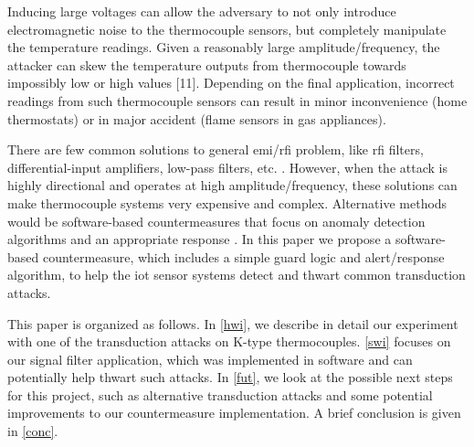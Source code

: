 Inducing large voltages can allow the adversary to not only introduce electromagnetic noise to the thermocouple sensors, but completely manipulate the temperature readings. Given a reasonably large amplitude/frequency, the attacker can skew the temperature outputs from thermocouple towards impossibly low or high values [11]. Depending on the final application, incorrect readings from such thermocouple sensors can result in minor inconvenience (home thermostats) or in major accident (flame sensors in gas appliances). 

There are few common solutions to general \ac{emi}/\ac{rfi} problem, like \ac{rfi} filters, differential-input amplifiers, low-pass filters, etc. \cite{Duff10}. However, when the attack is highly directional and operates at high amplitude/frequency, these solutions can make thermocouple systems very expensive and complex. Alternative methods would be software-based countermeasures that focus on anomaly detection algorithms and an appropriate response \cite{Amitai16}. In this paper we propose a software-based countermeasure, which includes a simple guard logic and alert/response algorithm, to help the \ac{iot} sensor systems detect and thwart common transduction attacks.

This paper is organized as follows. In \cref{hwi}, we describe in detail our experiment with one of the transduction attacks on K-type thermocouples. \cref{swi} focuses on our signal filter application, which was implemented in software and can potentially help thwart such attacks. In \cref{fut}, we look at the possible next steps for this project, such as alternative transduction attacks and some potential improvements to our countermeasure implementation. A brief conclusion is given in \cref{conc}.


